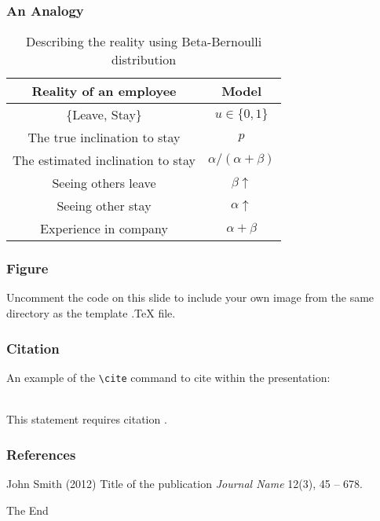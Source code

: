 \documentclass{beamer}
\begin{document}
\begin{frame}
\frametitle{An Analogy}
\begin{table}
\centering
\begin{tabular}{|c|c|}
\hline
Reality of an employee             &  Model \\\hline
\{Leave, Stay\}                    &  $u\in \{0, 1\}$\\
The true inclination to stay       &  $p$ \\
The estimated inclination to stay  & $\alpha/(\alpha+\beta)$ \\
Seeing others leave                & $\beta \uparrow$ \\
Seeing other stay                  & $\alpha \uparrow$ \\
Experience in company              & $\alpha + \beta$ \\
\hline
\end{tabular}
\caption{Describing the reality using Beta-Bernoulli distribution}
\end{table}
\end{frame}

\begin{frame}
\frametitle{Figure}
Uncomment the code on this slide to include your own image from the same directory as the template .TeX file.
\end{frame}


\begin{frame}[fragile] %
\frametitle{Citation}
An example of the \verb|\cite| command to cite within the presentation:\\~

This statement requires citation \cite{p1}.
\end{frame}


\begin{frame}
\frametitle{References}
\footnotesize{
\begin{thebibliography}{99} %
 John Smith (2012)
\newblock Title of the publication
\newblock \emph{Journal Name} 12(3), 45 -- 678.
\end{thebibliography}
}
\end{frame}


\begin{frame}
\Huge{\centerline{The End}}
\end{frame}

\end{document}
